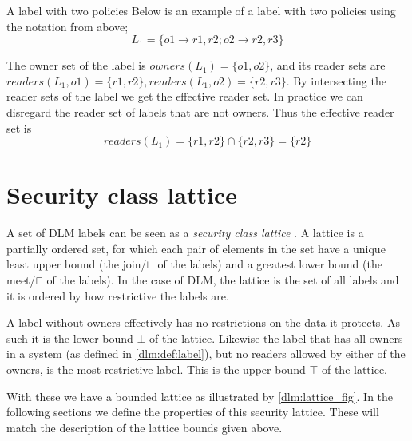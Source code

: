 \begin{example}{A label with two policies}\label{dlm:ex:simple_label}
  Below is an example of a label with two policies using the notation from above;
  $$L_1 = \{o1 \rightarrow r1, r2; o2 \rightarrow r2, r3\}$$

  The owner set of the label is $owners(L_1) = \{o1, o2\}$, and its reader sets are $readers(L_1, o1) = \{r1, r2\}, readers(L_1, o2) = \{r2, r3\}$.
  By intersecting the reader sets of the label we get the effective reader set.
  In practice we can disregard the reader set of labels that are not owners.
  Thus the effective reader set is
  $$readers(L_1) = \{r1,r2\} \cap \{r2, r3\} = \{r2\}$$
\end{example}

\section{Security class lattice}
A set of DLM labels can be seen as a \emph{security class lattice} \cite[pp. 6-7]{myers1997}.
A lattice is a partially ordered set, for which each pair of elements in the set have a unique least upper bound (the join/$\sqcup$ of the labels) and a greatest lower bound (the meet/$\sqcap$ of the labels).
In the case of DLM, the lattice is the set of all labels and it is ordered by how restrictive the labels are.

A label without owners effectively has no restrictions on the data it protects.
As such it is the lower bound $\bot$ of the lattice.
Likewise the label that has all owners in a system (as defined in \cref{dlm:def:label}), but no readers allowed by either of the owners, is the most restrictive label.
This is the upper bound $\top$ of the lattice.

With these we have a bounded lattice as illustrated by \cref{dlm:lattice_fig}.
In the following sections we define the properties of this security lattice.
These will match the description of the lattice bounds given above.

